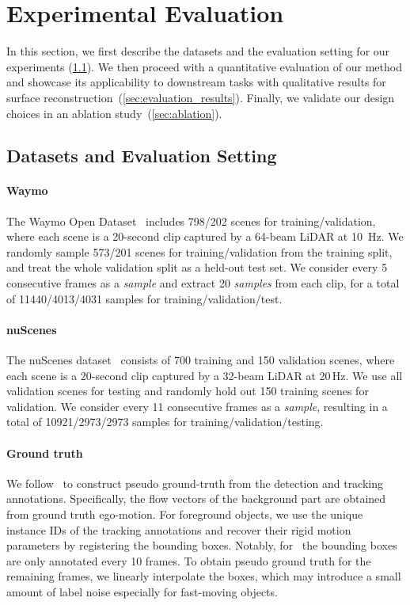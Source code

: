 \section{Experimental Evaluation}
\label{sec:results}
In this section, we first describe the datasets and the evaluation setting for our experiments (\cref{sec:dataset_evalsetting}). We then proceed with a quantitative evaluation of our method and showcase its applicability to downstream tasks with qualitative results for surface reconstruction~(\cref{sec:evaluation_results}). Finally, we validate our design choices in an ablation study~(\cref{sec:ablation}).

\subsection{Datasets and Evaluation Setting}
\label{sec:dataset_evalsetting}

\paragraph{Waymo} The Waymo Open Dataset~\cite{sun2020scalability} includes 798/202 scenes for training/validation, where each scene is a 20-second clip captured by a 64-beam LiDAR at 10~Hz. We randomly sample 573/201 scenes for training/validation from the training split, and treat the whole validation split as a held-out test set. We consider every 5 consecutive frames as a \textit{sample} and extract 20 \textit{samples} from each clip, for a total of 11440/4013/4031 samples for training/validation/test. %
    
\paragraph{nuScenes} The nuScenes dataset~\cite{caesar2020nuscenes} consists of 700 training and 150 validation scenes, where each scene is a 20-second clip captured by a 32-beam LiDAR at 20$\,$Hz. We use all validation scenes for testing and randomly hold out 150 training scenes for validation. We consider every 11 consecutive frames as a \textit{sample}, resulting in a total of 10921/2973/2973 samples for training/validation/testing.

\paragraph{Ground truth} We follow~\cite{jund2021scalable} to construct pseudo ground-truth from the detection and tracking annotations. Specifically, the flow vectors of the background part are obtained from ground truth ego-motion. For foreground objects, we use the
unique instance IDs of the tracking annotations and recover their rigid motion parameters by registering the bounding boxes.
Notably, for \nuscenes~the bounding boxes are only annotated every 10 frames. To obtain pseudo ground truth for the remaining frames, we linearly interpolate the boxes, which may introduce a small amount of label noise especially for fast-moving objects.

